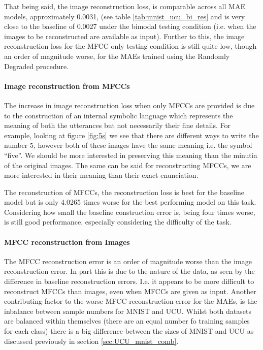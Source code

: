 That being said, the image reconstruction loss, is comparable across all MAE models, approximately 0.0031, (see table \ref{tab:mnist_ucu_bi_res} and is very close to the baseline of 0.0027 under the bimodal testing condition (i.e. when the images to be reconstructed are available as input). Further to this, the image reconstruction loss for the MFCC only testing condition is still quite low, though an order of magnitude worse, for the MAEs trained using the Randomly Degraded procedure.

\paragraph{Image reconstruction from MFCCs}
The increase in image reconstruction loss when only MFCCs are provided is due to the construction of an internal symbolic language which represents the meaning of both the utterances but not necessarily their fine details. For example, looking at figure \ref{fig:5s} we see that there are different ways to write the number 5, however both of these images have the same meaning i.e. the symbol ``five''. We should be more interested in preserving this meaning than the minutia of the original images. The same can be said for reconstructing MFCCs, we are more interested in their meaning than their exact enunciation.  

The reconstruction of MFCCs, the reconstruction loss is best for the baseline model but is only 4.0265 times worse for the best performing model on this task. Considering how small the baseline construction error is, being four times worse, is still good performance, especially considering the difficulty of the task.

\paragraph{MFCC reconstruction from Images}
The MFCC reconstruction error is an order of magnitude worse than the image reconstruction error. In part this is due to the nature of the data, as seen by the difference in baseline reconstruction errors. I.e. it appears to be more difficult to reconstruct MFCCs than images, even when MFCCs are given as input.
Another contributing factor to the worse MFCC reconstruction error for the MAEs, is the inbalance between sample numbers for MNIST and UCU. Whilst both datasets are balanced within themselves (there are an equal number fo training samples for each class) there is a big difference between the sizes of MNIST and UCU as discussed previously in section \ref{sec:UCU_mnist_comb}. 

